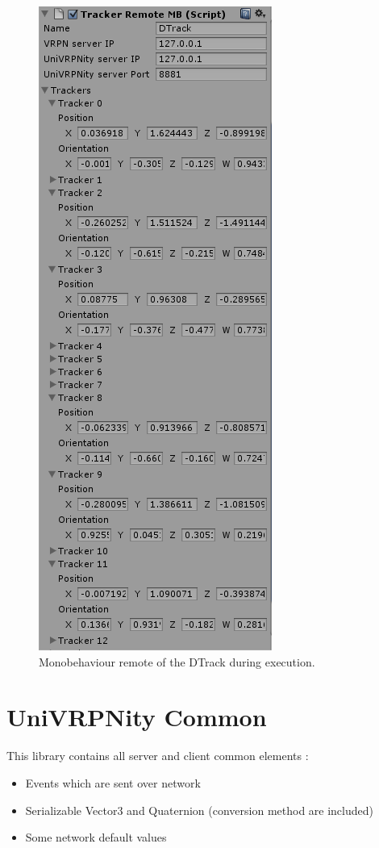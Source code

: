 \documentclass[11pt]{article} %
\begin{document}
			\begin{figure}[H]
				\includegraphics{TrackerDTrack.png}
				\caption{Monobehaviour remote of the DTrack during execution.}
			\end{figure}


\section{UniVRPNity Common}
	This library contains all server and client common elements : 
	\begin{itemize}
		\item Events which are sent over network
		\item Serializable Vector3 and Quaternion (conversion method are included)
		\item Some network default values
	\end{itemize}
	
\end{document}
